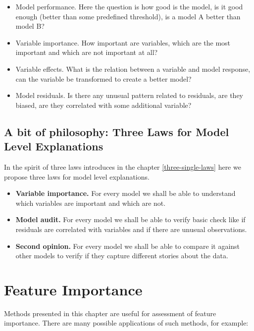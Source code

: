 \documentclass[12pt,]{krantz}
\providecommand{\tightlist}{%
  \setlength{\itemsep}{0pt}\setlength{\parskip}{0pt}}
\theoremstyle{definition}
\theoremstyle{definition}
\theoremstyle{definition}
\theoremstyle{remark}
\begin{document}
\begin{itemize}
\tightlist
\item
  Model performance. Here the question is how good is the model, is it
  good enough (better than some predefined threshold), is a model A
  better than model B?
\item
  Variable importance. How important are variables, which are the most
  important and which are not important at all?
\item
  Variable effects. What is the relation between a variable and model
  response, can the variable be transformed to create a better model?
\item
  Model residuals. Is there any unusual pattern related to residuals,
  are they biased, are they correlated with some additional variable?
\end{itemize}

\hypertarget{a-bit-of-philosophy-three-laws-for-model-level-explanations}{%
\subsection{A bit of philosophy: Three Laws for Model Level
Explanations}\label{a-bit-of-philosophy-three-laws-for-model-level-explanations}}

In the spirit of three laws introduces in the chapter
\ref{three-single-laws} here we propose three laws for model level
explanations.

\begin{itemize}
\tightlist
\item
  \textbf{Variable importance.} For every model we shall be able to
  understand which variables are important and which are not.
\item
  \textbf{Model audit.} For every model we shall be able to verify basic
  check like if residuals are correlated with variables and if there are
  unusual observations.
\item
  \textbf{Second opinion.} For every model we shall be able to compare
  it against other models to verify if they capture different stories
  about the data.
\end{itemize}

\hypertarget{featureImportance}{%
\section{Feature Importance}\label{featureImportance}}

Methods presented in this chapter are useful for assessment of feature
importance. There are many possible applications of such methods, for
example:
\end{document}
